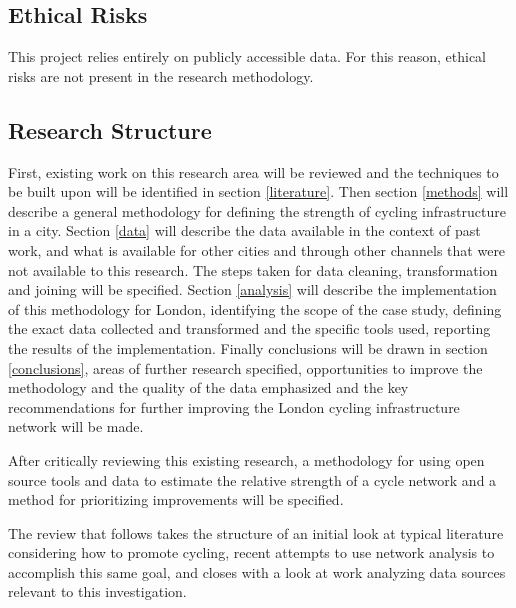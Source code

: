 \subsection{Ethical Risks}

This project relies entirely on publicly accessible data. For this reason, ethical risks are not present in the research methodology.  

\subsection{Research Structure}

First, existing work on this research area will be reviewed and the techniques to be built upon will be identified in section \ref{literature}.  Then  section \ref{methods} will describe a general methodology for defining the strength of cycling infrastructure in a city. Section \ref{data} will describe the data available in the context of past work, and what is available for other cities and through other channels that were not available to this research. The steps taken for data cleaning, transformation and joining will be specified. Section \ref{analysis} will describe the implementation of this methodology for London, identifying the scope of the case study, defining the exact data collected and transformed and the specific tools used, reporting the results of the implementation. Finally conclusions will be drawn in section \ref{conclusions}, areas of further research specified, opportunities to improve the methodology and the quality of the data emphasized and the key recommendations for further improving the London cycling infrastructure network will be made. 

After critically reviewing this existing research, a methodology for using open source tools and data to estimate the relative strength of a cycle network and a method for prioritizing improvements will be specified.

The review that follows takes the structure of an initial look at typical literature considering how to promote cycling, recent attempts to use network analysis to accomplish this same goal, and closes with a look at work analyzing data sources relevant to this investigation. 

%


